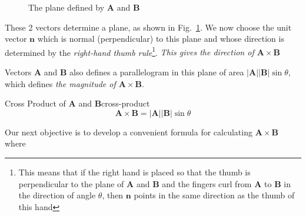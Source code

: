 \begin{figure}[H]
    \centering
    \caption{The plane defined by $\boldsymbol{A}$ and $\boldsymbol{B}$}
    \label{fig:cross-prod}
\end{figure}

These 2 vectors determine a plane, as shown in Fig.~\ref{fig:cross-prod}. We now choose the unit
vector $\boldsymbol{n}$ which is normal (perpendicular) to this plane and whose direction is determined by the
\textit{right-hand thumb rule}\footnote{This means that if the right hand is placed so that the thumb is perpendicular
to the plane of $\boldsymbol{A}$ and $\boldsymbol{B}$ and the fingers curl from $\boldsymbol{A}$ to $\boldsymbol{B}$ in
the direction of angle $\theta$, then $\boldsymbol{n}$ points in the same direction as the thumb of this hand}.
\textit{This gives the direction of $\boldsymbol{A} \times \boldsymbol{B}$}

Vectors $\boldsymbol{A}$ and $\boldsymbol{B}$ also defines a parallelogram in this plane of area
$\vert \boldsymbol{A} \vert\vert \boldsymbol{B} \vert\sin{\theta}$, which defines \textit{the magnitude of
$\boldsymbol{A} \times \boldsymbol{B}$}.

\begin{Definition}{Cross Product of $\boldsymbol{A}$ and $\boldsymbol{B}$}{cross-product}
    \begin{equation}
        \boldsymbol{A} \times \boldsymbol{B} = \vert \boldsymbol{A} \vert\vert \boldsymbol{B} \vert\sin{\theta}
    \end{equation}
\end{Definition}

Our next objective is to develop a convenient formula for calculating $\boldsymbol{A} \times \boldsymbol{B}$ where

